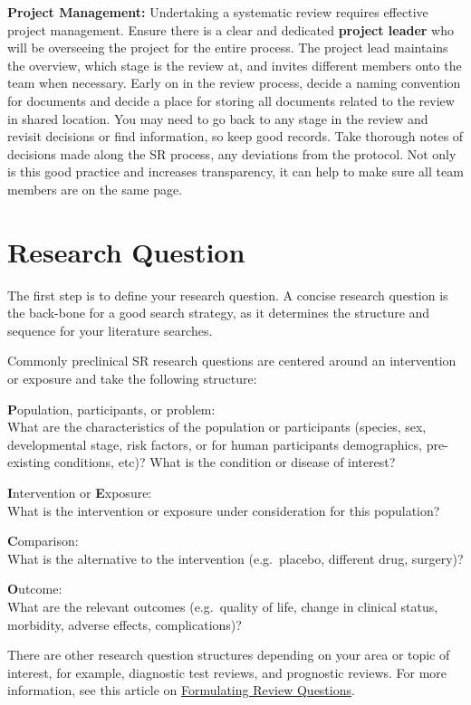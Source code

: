 \documentclass[
]{book}
\begin{document}
\textbf{Project Management:}
Undertaking a systematic review requires effective project management.
Ensure there is a clear and dedicated \textbf{project leader} who will be overseeing the project for the entire process. The project lead maintains the overview, which stage is the review at, and invites different members onto the team when necessary.
Early on in the review process, decide a naming convention for documents and decide a place for storing all documents related to the review in shared location. You may need to go back to any stage in the review and revisit decisions or find information, so keep good records. Take thorough notes of decisions made along the SR process, any deviations from the protocol. Not only is this good practice and increases transparency, it can help to make sure all team members are on the same page.

\hypertarget{researchquestion}{%
\chapter{Research Question}\label{researchquestion}}

The first step is to define your research question. A concise research question is the back-bone for a good search strategy, as it determines the structure and sequence for your literature searches.

Commonly preclinical SR research questions are centered around an intervention or exposure and take the following structure:

\textbf{P}opulation, participants, or problem:\\
What are the characteristics of the population or participants (species, sex, developmental stage, risk factors, or for human participants demographics, pre-existing conditions, etc)?
What is the condition or disease of interest?

\textbf{I}ntervention or \textbf{E}xposure:\\
What is the intervention or exposure under consideration for this population?

\textbf{C}omparison:\\
What is the alternative to the intervention (e.g.~placebo, different drug, surgery)?

\textbf{O}utcome:\\
What are the relevant outcomes (e.g.~quality of life, change in clinical status, morbidity, adverse effects, complications)?

There are other research question structures depending on your area or topic of interest, for example, diagnostic test reviews, and prognostic reviews.
For more information, see this article on \href{https://journals.library.ualberta.ca/eblip/index.php/EBLIP/article/view/9741/8144}{Formulating Review Questions}.
\end{document}
